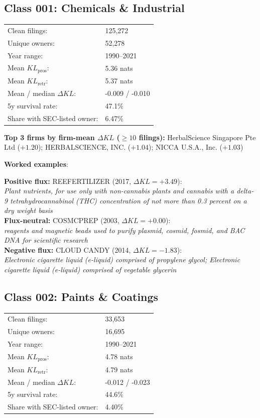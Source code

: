\subsection*{Class 001: Chemicals \& Industrial}
\label{app:industry-001}

\begin{tabular}{ll}
Clean filings: & 125,272 \\
Unique owners: & 52,278 \\
Year range: & 1990--2021 \\
Mean $KL_\text{pros}$: & 5.36 nats \\
Mean $KL_\text{retr}$: & 5.37 nats \\
Mean / median $\Delta KL$: & -0.009 / -0.010 \\
5y survival rate: & 47.1\% \\
Share with SEC-listed owner: & 6.47\% \\
\end{tabular}

\textbf{Top 3 firms by firm-mean $\Delta KL$ ($\geq 10$ filings):} HerbalScience Singapore Pte Ltd ($+1.20$); HERBALSCIENCE, INC. ($+1.04$); NICCA U.S.A., Inc. ($+1.03$)

\textbf{Worked examples}:

  \textbf{Positive flux:} \textsc{REEFERTILIZER} (2017, $\Delta KL=+3.49$):\\
  \textit{Plant nutrients, for use only with non-cannabis plants and cannabis with a delta-9 tetrahydrocannabinol (THC) concentration of not more than 0.3 percent on a dry weight basis}\\
  \textbf{Flux-neutral:} \textsc{COSMCPREP} (2003, $\Delta KL=+0.00$):\\
  \textit{reagents and magnetic beads used to purify plasmid, cosmid, fosmid, and BAC DNA for scientific research}\\
  \textbf{Negative flux:} \textsc{CLOUD CANDY} (2014, $\Delta KL=-1.83$):\\
  \textit{Electronic cigarette liquid (e-liquid) comprised of propylene glycol; Electronic cigarette liquid (e-liquid) comprised of vegetable glycerin}\\

\subsection*{Class 002: Paints \& Coatings}
\label{app:industry-002}

\begin{tabular}{ll}
Clean filings: & 33,653 \\
Unique owners: & 16,695 \\
Year range: & 1990--2021 \\
Mean $KL_\text{pros}$: & 4.78 nats \\
Mean $KL_\text{retr}$: & 4.79 nats \\
Mean / median $\Delta KL$: & -0.012 / -0.023 \\
5y survival rate: & 44.6\% \\
Share with SEC-listed owner: & 4.40\% \\
\end{tabular}

